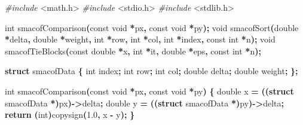 \documentclass[
  12pt,
]{article}
\newenvironment{Shaded}{\begin{snugshade}}{\end{snugshade}}
\newcommand{\ControlFlowTok}[1]{\textcolor[rgb]{0.13,0.29,0.53}{\textbf{#1}}}
\newcommand{\DataTypeTok}[1]{\textcolor[rgb]{0.13,0.29,0.53}{#1}}
\newcommand{\FloatTok}[1]{\textcolor[rgb]{0.00,0.00,0.81}{#1}}
\newcommand{\ImportTok}[1]{#1}
\newcommand{\KeywordTok}[1]{\textcolor[rgb]{0.13,0.29,0.53}{\textbf{#1}}}
\newcommand{\NormalTok}[1]{#1}
\newcommand{\OperatorTok}[1]{\textcolor[rgb]{0.81,0.36,0.00}{\textbf{#1}}}
\newcommand{\PreprocessorTok}[1]{\textcolor[rgb]{0.56,0.35,0.01}{\textit{#1}}}
\begin{document}
\begin{Shaded}
\begin{Highlighting}[]

\PreprocessorTok{\#include }\ImportTok{\textless{}math.h\textgreater{}}
\PreprocessorTok{\#include }\ImportTok{\textless{}stdio.h\textgreater{}}
\PreprocessorTok{\#include }\ImportTok{\textless{}stdlib.h\textgreater{}}

\DataTypeTok{int}\NormalTok{ smacofComparison}\OperatorTok{(}\DataTypeTok{const} \DataTypeTok{void} \OperatorTok{*}\NormalTok{px}\OperatorTok{,} \DataTypeTok{const} \DataTypeTok{void} \OperatorTok{*}\NormalTok{py}\OperatorTok{);}
\DataTypeTok{void}\NormalTok{ smacofSort}\OperatorTok{(}\DataTypeTok{double} \OperatorTok{*}\NormalTok{delta}\OperatorTok{,} \DataTypeTok{double} \OperatorTok{*}\NormalTok{weight}\OperatorTok{,} \DataTypeTok{int} \OperatorTok{*}\NormalTok{row}\OperatorTok{,} \DataTypeTok{int} \OperatorTok{*}\NormalTok{col}\OperatorTok{,} \DataTypeTok{int} \OperatorTok{*}\NormalTok{index}\OperatorTok{,}
                \DataTypeTok{const} \DataTypeTok{int} \OperatorTok{*}\NormalTok{n}\OperatorTok{);}
\DataTypeTok{void}\NormalTok{ smacofTieBlocks}\OperatorTok{(}\DataTypeTok{const} \DataTypeTok{double} \OperatorTok{*}\NormalTok{x}\OperatorTok{,} \DataTypeTok{int} \OperatorTok{*}\NormalTok{it}\OperatorTok{,} \DataTypeTok{double} \OperatorTok{*}\NormalTok{eps}\OperatorTok{,} \DataTypeTok{const} \DataTypeTok{int} \OperatorTok{*}\NormalTok{n}\OperatorTok{);}

\KeywordTok{struct}\NormalTok{ smacofData }\OperatorTok{\{}
    \DataTypeTok{int}\NormalTok{ index}\OperatorTok{;}
    \DataTypeTok{int}\NormalTok{ row}\OperatorTok{;}
    \DataTypeTok{int}\NormalTok{ col}\OperatorTok{;}
    \DataTypeTok{double}\NormalTok{ delta}\OperatorTok{;}
    \DataTypeTok{double}\NormalTok{ weight}\OperatorTok{;}
\OperatorTok{\};}

\DataTypeTok{int}\NormalTok{ smacofComparison}\OperatorTok{(}\DataTypeTok{const} \DataTypeTok{void} \OperatorTok{*}\NormalTok{px}\OperatorTok{,} \DataTypeTok{const} \DataTypeTok{void} \OperatorTok{*}\NormalTok{py}\OperatorTok{)} \OperatorTok{\{}
    \DataTypeTok{double}\NormalTok{ x }\OperatorTok{=} \OperatorTok{((}\KeywordTok{struct}\NormalTok{ smacofData }\OperatorTok{*)}\NormalTok{px}\OperatorTok{){-}\textgreater{}}\NormalTok{delta}\OperatorTok{;}
    \DataTypeTok{double}\NormalTok{ y }\OperatorTok{=} \OperatorTok{((}\KeywordTok{struct}\NormalTok{ smacofData }\OperatorTok{*)}\NormalTok{py}\OperatorTok{){-}\textgreater{}}\NormalTok{delta}\OperatorTok{;}
    \ControlFlowTok{return} \OperatorTok{(}\DataTypeTok{int}\OperatorTok{)}\NormalTok{copysign}\OperatorTok{(}\FloatTok{1.0}\OperatorTok{,}\NormalTok{ x }\OperatorTok{{-}}\NormalTok{ y}\OperatorTok{);}
\OperatorTok{\}}


\end{Highlighting}
\end{Shaded}
\end{document}
